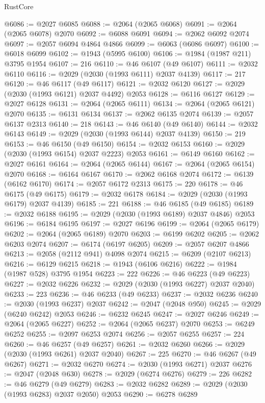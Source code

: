 \begin{lexlean}{RustCore}
\begin{coremodule}
@6086 := @2027 @6085
@6088 := @2064 (@2065 @6068)
@6091 := @2064 (@2065 @6078) @2070
@6092 := @6088 @6091
@6094 := @2062 @6092 @2074
@6097 := @2057 @6094 @4864 @4866
@6099 := @6063 (@6086 @6097)
@6100 := @6018 @6099
@6102 := @1943 (@5995 @6100)
@6106 := @1984 (@1987 @211) @3795 @1954
@6107 := 216
@6110 := @46 @6107 (@49 @6107)
@6111 := @2032 @6110
@6116 := @2029 (@2030 (@1993 @6111) @2037 @4139)
@6117 := 217
@6120 := @46 @6117 (@49 @6117)
@6121 := @2032 @6120
@6127 := @2029 (@2030 (@1993 @6121) @2037 @4492) @2053
@6128 := @6116 @6127
@6129 := @2027 @6128
@6131 := @2064 (@2065 @6111)
@6134 := @2064 (@2065 @6121) @2070
@6135 := @6131 @6134
@6137 := @2062 @6135 @2074
@6139 := @2057 @6137 @2313
@6140 := 218
@6143 := @46 @6140 (@49 @6140)
@6144 := @2032 @6143
@6149 := @2029 (@2030 (@1993 @6144) @2037 @4139)
@6150 := 219
@6153 := @46 @6150 (@49 @6150)
@6154 := @2032 @6153
@6160 := @2029 (@2030 (@1993 @6154) @2037 @2223) @2053
@6161 := @6149 @6160
@6162 := @2027 @6161
@6164 := @2064 (@2065 @6144)
@6167 := @2064 (@2065 @6154) @2070
@6168 := @6164 @6167
@6170 := @2062 @6168 @2074
@6172 := @6139 (@6162 @6170)
@6174 := @2057 @6172 @2313
@6175 := 220
@6178 := @46 @6175 (@49 @6175)
@6179 := @2032 @6178
@6184 := @2029 (@2030 (@1993 @6179) @2037 @4139)
@6185 := 221
@6188 := @46 @6185 (@49 @6185)
@6189 := @2032 @6188
@6195 := @2029 (@2030 (@1993 @6189) @2037 @4846) @2053
@6196 := @6184 @6195
@6197 := @2027 @6196
@6199 := @2064 (@2065 @6179)
@6202 := @2064 (@2065 @6189) @2070
@6203 := @6199 @6202
@6205 := @2062 @6203 @2074
@6207 := @6174 (@6197 @6205)
@6209 := @2057 @6207 @4866
@6213 := @2058 (@2112 @941) @4098 @2074
@6215 := @6209 (@2107 @6213)
@6216 := @6129 @6215
@6218 := @1943 (@6106 @6216)
@6222 := @1984 (@1987 @528) @3795 @1954
@6223 := 222
@6226 := @46 @6223 (@49 @6223)
@6227 := @2032 @6226
@6232 := @2029 (@2030 (@1993 @6227) @2037 @2040)
@6233 := 223
@6236 := @46 @6233 (@49 @6233)
@6237 := @2032 @6236
@6240 := @2030 (@1993 @6237) @2037
@6242 := @2047 (@2048 @950)
@6245 := @2029 (@6240 @6242) @2053
@6246 := @6232 @6245
@6247 := @2027 @6246
@6249 := @2064 (@2065 @6227)
@6252 := @2064 (@2065 @6237) @2070
@6253 := @6249 @6252
@6255 := @2097 @6253 @2074
@6256 := @2057 @6255
@6257 := 224
@6260 := @46 @6257 (@49 @6257)
@6261 := @2032 @6260
@6266 := @2029 (@2030 (@1993 @6261) @2037 @2040)
@6267 := 225
@6270 := @46 @6267 (@49 @6267)
@6271 := @2032 @6270
@6274 := @2030 (@1993 @6271) @2037
@6276 := @2047 (@2048 @630)
@6278 := @2029 (@6274 @6276)
@6279 := 226
@6282 := @46 @6279 (@49 @6279)
@6283 := @2032 @6282
@6289 := @2029 (@2030 (@1993 @6283) @2037 @2050) @2053
@6290 := @6278 @6289

\end{coremodule}
\end{lexlean}
